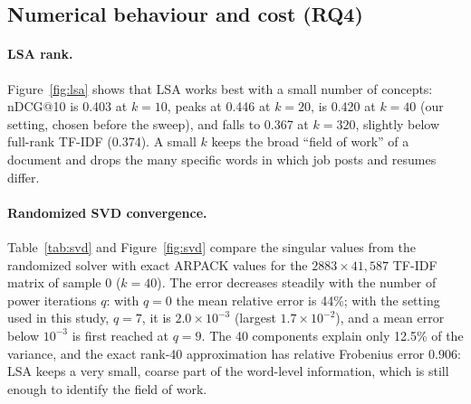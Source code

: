 \documentclass[12pt,a4paper]{article}
\numberwithin{equation}{section}
\theoremstyle{definition}
\theoremstyle{plain}
\begin{document}
\begin{table}[htbp]
\centering
\small
\caption{Simultaneous assignment of all 400 sampled gigs (mean over 20 samples). \emph{True relevance} sums the category-based relevance of the chosen pairs; \emph{good match rate} is the share of the gigs that receive a resume from the primary matching category ($\mathrm{rel}=2$).}
\label{tab:assign}
\end{table}

\subsection{Numerical behaviour and cost (RQ4)}\label{sec:svdconv}
\paragraph{LSA rank.} Figure~\ref{fig:lsa} shows that LSA works best with a small number of concepts: nDCG@10 is 0.403 at $k=10$, peaks at 0.446 at $k=20$, is 0.420 at $k=40$ (our setting, chosen before the sweep), and falls to 0.367 at $k=320$, slightly below full-rank TF-IDF (0.374). A small $k$ keeps the broad \enquote{field of work} of a document and drops the many specific words in which job posts and resumes differ.

\paragraph{Randomized SVD convergence.} Table~\ref{tab:svd} and Figure~\ref{fig:svd} compare the singular values from the randomized solver with exact ARPACK values for the $2883\times41{,}587$ TF-IDF matrix of sample 0 ($k=40$). The error decreases steadily with the number of power iterations $q$: with $q=0$ the mean relative error is 44\%; with the setting used in this study, $q=7$, it is $2.0\times10^{-3}$ (largest $1.7\times10^{-2}$), and a mean error below $10^{-3}$ is first reached at $q=9$. The 40 components explain only 12.5\% of the variance, and the exact rank-40 approximation has relative Frobenius error $0.906$: LSA keeps a very small, coarse part of the word-level information, which is still enough to identify the field of work.
\end{document}
